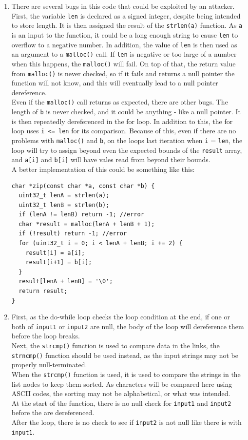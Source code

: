 \documentclass{jhwhw}
\begin{document}
\begin{enumerate}
\item There are several bugs in this code that could be exploited by an attacker. First, the variable \verb^len^ is declared as a signed integer, despite being intended to store length. It is then assigned the result of the \verb^strlen(a)^ function. As \verb^a^ is an input to the function, it could be a long enough string to cause \verb^len^ to overflow to a negative number. In addition, the value of \verb^len^ is then used as an argument to a \verb^malloc()^ call. If \verb^len^ is negative or too large of a number when this happens, the \verb^malloc()^ will fail. On top of that, the return value from \verb^malloc()^ is never checked, so if it fails and returns a null pointer the function will not know, and this will eventually lead to a null pointer dereference.
\\
Even if the \verb^malloc()^ call returns as expected, there are other bugs. The length of \verb^b^ is never checked, and it could be anything - like a null pointer. It is then repeatedly dereferenced in the for loop. In addition to this, the for loop uses \verb^i <= len^ for its comparison. Because of this, even if there are no problems with \verb^malloc()^ and \verb^b^, on the loops last iteration when \verb^i^ = \verb^len^, the loop will try to assign beyond even the expected bounds of the \verb^result^ array, and \verb^a[i]^ and \verb^b[i]^ will have vales read from beyond their bounds.
\\ A better implementation of this could be something like this:
\begin{verbatim}
char *zip(const char *a, const char *b) {
  uint32_t lenA = strlen(a);
  uint32_t lenB = strlen(b);
  if (lenA != lenB) return -1; //error
  char *result = malloc(lenA + lenB + 1);
  if (!result) return -1; //error
  for (uint32_t i = 0; i < lenA + lenB; i += 2) {
    result[i] = a[i];
    result[i+1] = b[i];
  }
  result[lenA + lenB] = '\0';
  return result;
}
\end{verbatim}
\item First, as the do-while loop checks the loop condition at the end, if one or both of \verb^input1^ or \verb^input2^ are null, the body of the loop will dereference them before the loop breaks.
\\
Next, the \verb^strcmp()^ function is used to compare data in the links, the \verb^strncmp()^ function should be used instead, as the input strings may not be properly null-terminated.
\\
When the \verb^strcmp()^ function is used, it is used to compare the strings in the list nodes to keep them sorted. As characters will be compared here using ASCII codes, the sorting may not be alphabetical, or what was intended.
\\
At the start of the function, there is no null check for \verb^input1^ and \verb^input2^ before the are dereferenced.
\\
After the loop, there is no check to see if \verb^input2^ is not null like there is with \verb^input1^.
\end{enumerate}
\end{document}
